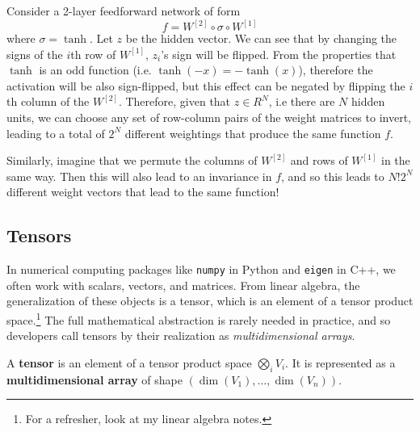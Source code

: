 \documentclass{article}
\begin{document}
  \begin{theorem}
    Consider a 2-layer feedforward network of form 
    \begin{equation}
      f = W^{[2]} \circ \sigma \circ W^{[1]}
    \end{equation} 
    where $\sigma = \tanh$. Let $z$ be the hidden vector. We can see that by changing the signs of the $i$th row of $W^{[1]}$, $z_i$'s sign will be flipped. From the properties that $\tanh$ is an odd function (i.e. $\tanh(-x) = - \tanh(x)$), therefore the activation will be also sign-flipped, but this effect can be negated by flipping the $i$th column of the $W^{[2]}$. Therefore, given that $z \in R^{N}$, i.e there are $N$ hidden units, we can choose any set of row-column pairs of the weight matrices to invert, leading to a total of $2^N$ different weightings that produce the same function $f$. 

    Similarly, imagine that we permute the columns of $W^{[2]}$ and rows of $W^{[1]}$ in the same way. Then this will also lead to an invariance in $f$, and so this leads to $N! 2^N$ different weight vectors that lead to the same function! 
  \end{theorem}

\subsection{Tensors} 

  In numerical computing packages like \texttt{numpy} in Python and \texttt{eigen} in C++, we often work with scalars, vectors, and matrices. From linear algebra, the generalization of these objects is a tensor, which is an element of a tensor product space.\footnote{For a refresher, look at my linear algebra notes.} The full mathematical abstraction is rarely needed in practice, and so developers call tensors by their realization as \textit{multidimensional arrays}. 
  
  \begin{definition}[Tensor]
    A \textbf{tensor} is an element of a tensor product space $\bigotimes_i V_i$. It is represented as a \textbf{multidimensional array} of shape $(\dim(V_1), \ldots, \dim(V_n))$. 
  \end{definition}
\end{document}
